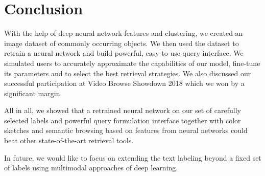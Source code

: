 \chapter*{Conclusion}

With the help of deep neural network features and clustering, we created an image dataset of commonly occurring objects. We then used the dataset to retrain a neural network and build powerful, easy-to-use query interface. We simulated users to accurately approximate the capabilities of our model, fine-tune its parameters and to select the best retrieval strategies. We also discussed our successful participation at Video Browse Showdown 2018 which we won by a significant margin.

All in all, we showed that a retrained neural network on our set of carefully selected labels and powerful query formulation interface together with color sketches and semantic browsing based on features from neural networks could beat other state-of-the-art retrieval tools.


In future, we would like to focus on extending the text labeling beyond a fixed set of labels using multimodal approaches of deep learning.